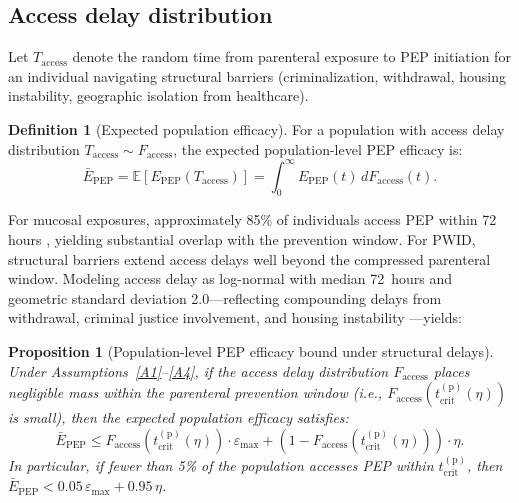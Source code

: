\documentclass[12pt,a4paper]{article}
\theoremstyle{plain}
\newtheorem{proposition}[theorem]{Proposition}
\theoremstyle{definition}
\newtheorem{definition}[theorem]{Definition}
\theoremstyle{remark}
\newcommand{\Epep}{E_{\mathrm{PEP}}}
\newcommand{\tcrit}{t_{\mathrm{crit}}}
\newcommand{\E}{\mathbb{E}}
\begin{document}
\subsection{Access delay distribution}

Let $T_{\mathrm{access}}$ denote the random time from parenteral exposure to PEP initiation for an individual navigating structural barriers (criminalization, withdrawal, housing instability, geographic isolation from healthcare).

\begin{definition}[Expected population efficacy]\label{def:pop-eff}
For a population with access delay distribution $T_{\mathrm{access}} \sim F_{\mathrm{access}}$, the expected population-level PEP efficacy is:
\begin{equation}\label{eq:pop-eff}
    \bar{E}_{\mathrm{PEP}} = \E[\Epep(T_{\mathrm{access}})] = \int_0^\infty \Epep(t)\,dF_{\mathrm{access}}(t).
\end{equation}
\end{definition}

For mucosal exposures, approximately 85\% of individuals access PEP within 72 hours \citep{ref:Tanner2025}, yielding substantial overlap with the prevention window. For PWID, structural barriers extend access delays well beyond the compressed parenteral window. Modeling access delay as log-normal with median 72~hours and geometric standard deviation 2.0---reflecting compounding delays from withdrawal, criminal justice involvement, and housing instability \citep{ref:Taylor2019,ref:Baugher2025}---yields:

\begin{proposition}[Population-level PEP efficacy bound under structural delays]\label{prop:infeasible}
Under Assumptions~\ref{A1}--\ref{A4}, if the access delay distribution $F_{\mathrm{access}}$ places negligible mass within the parenteral prevention window (i.e., $F_{\mathrm{access}}(\tcrit^{(\mathrm{p})}(\eta))$ is small), then the expected population efficacy satisfies:
\begin{equation}\label{eq:futility-bound}
    \bar{E}_{\mathrm{PEP}} \leq F_{\mathrm{access}}(\tcrit^{(\mathrm{p})}(\eta)) \cdot \varepsilon_{\max} + (1 - F_{\mathrm{access}}(\tcrit^{(\mathrm{p})}(\eta))) \cdot \eta.
\end{equation}
In particular, if fewer than 5\% of the population accesses PEP within $\tcrit^{(\mathrm{p})}$, then $\bar{E}_{\mathrm{PEP}} < 0.05\,\varepsilon_{\max} + 0.95\,\eta$.
\end{proposition}
\end{document}
